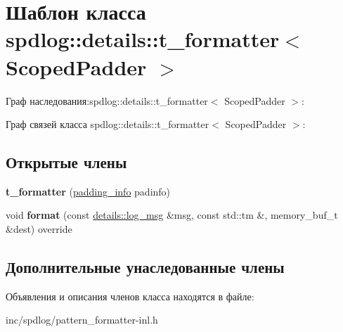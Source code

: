 \hypertarget{classspdlog_1_1details_1_1t__formatter}{}\section{Шаблон класса spdlog\+:\+:details\+:\+:t\+\_\+formatter$<$ Scoped\+Padder $>$}
\label{classspdlog_1_1details_1_1t__formatter}


Граф наследования\+:spdlog\+:\+:details\+:\+:t\+\_\+formatter$<$ Scoped\+Padder $>$\+:


Граф связей класса spdlog\+:\+:details\+:\+:t\+\_\+formatter$<$ Scoped\+Padder $>$\+:
\subsection*{Открытые члены}
\begin{DoxyCompactItemize}
\item 
\mbox{\label{classspdlog_1_1details_1_1t__formatter_aeaf2992c6885333fa5eb628a6a5be689}} 
{\bfseries t\+\_\+formatter} (\hyperlink{structspdlog_1_1details_1_1padding__info}{padding\+\_\+info} padinfo)
\item 
\mbox{\label{classspdlog_1_1details_1_1t__formatter_acd881b29965aae80e4a0185c8fbca224}} 
void {\bfseries format} (const \hyperlink{structspdlog_1_1details_1_1log__msg}{details\+::log\+\_\+msg} \&msg, const std\+::tm \&, memory\+\_\+buf\+\_\+t \&dest) override
\end{DoxyCompactItemize}
\subsection*{Дополнительные унаследованные члены}


Объявления и описания членов класса находятся в файле\+:\begin{DoxyCompactItemize}
\item 
inc/spdlog/pattern\+\_\+formatter-\/inl.\+h\end{DoxyCompactItemize}
